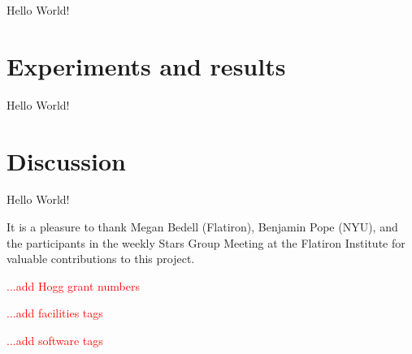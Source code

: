 \documentclass[modern]{aastex63}
\newcommand{\todo}[1]{\textcolor{red}{#1}}  %
\begin{document}
Hello World!

\section{Experiments and results}

Hello World!

\section{Discussion}

Hello World!

\acknowledgements
It is a pleasure to thank
  Megan Bedell (Flatiron),
  Benjamin Pope (NYU),
and the participants in the weekly Stars Group Meeting at the Flatiron
Institute for valuable contributions to this project.

\todo{...add Hogg grant numbers}

\todo{...add facilities tags}

\todo{...add software tags}


\end{document}
